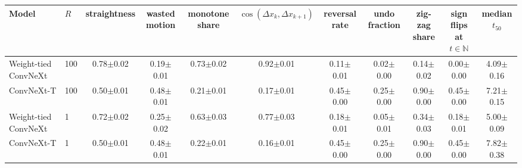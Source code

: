 \begin{tabular}{llccccccccc}
\toprule
Model & $R$ & straightness & wasted motion & monotone share & $\cos(\Delta x_k,\Delta x_{k+1})$ & reversal rate & undo fraction & zig-zag share & sign flips at $t\in\mathbb{N}$ & median $t_{50}$ \\
\midrule
Weight-tied ConvNeXt & 100 & 0.78$\pm$0.02 & 0.19$\pm$0.01 & 0.73$\pm$0.02 & 0.92$\pm$0.01 & 0.11$\pm$0.01 & 0.02$\pm$0.00 & 0.14$\pm$0.02 & 0.00$\pm$0.00 & 4.09$\pm$0.16 \\
ConvNeXt-T & 100 & 0.50$\pm$0.01 & 0.48$\pm$0.01 & 0.21$\pm$0.01 & 0.17$\pm$0.01 & 0.45$\pm$0.00 & 0.25$\pm$0.00 & 0.90$\pm$0.00 & 0.45$\pm$0.00 & 7.21$\pm$0.15 \\
Weight-tied ConvNeXt & 1 & 0.72$\pm$0.02 & 0.25$\pm$0.02 & 0.63$\pm$0.03 & 0.77$\pm$0.03 & 0.18$\pm$0.01 & 0.05$\pm$0.01 & 0.34$\pm$0.03 & 0.18$\pm$0.01 & 5.00$\pm$0.09 \\
ConvNeXt-T & 1 & 0.50$\pm$0.01 & 0.48$\pm$0.01 & 0.22$\pm$0.01 & 0.16$\pm$0.01 & 0.45$\pm$0.00 & 0.25$\pm$0.00 & 0.90$\pm$0.00 & 0.45$\pm$0.00 & 7.82$\pm$0.38 \\
\bottomrule
\end{tabular}
